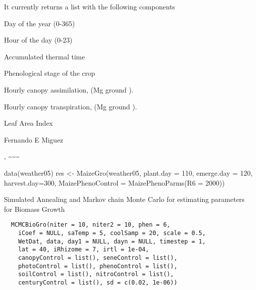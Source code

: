 \documentclass[letterpaper]{book}
\begin{document}
%
\begin{Value}
It currently returns a list with the following components

\begin{ldescription}
\item[\code{DayofYear}] Day of the year (0-365)

\item[\code{Hour}] Hour of the day (0-23)

\item[\code{TTTc}] Accumulated thermal time

\item[\code{PhenoStage}] Phenological stage of the crop

\item[\code{CanopyAssim}] Hourly canopy assimilation, (Mg
 ground ).

\item[\code{CanopyTrans}] Hourly canopy transpiration, (Mg
 ground ).

\item[\code{LAI}] Leaf Area Index
\end{ldescription}
\end{Value}
%
\begin{Author}\relax
Fernando E Miguez
\end{Author}
%
\begin{SeeAlso}\relax
{} 
, \textasciitilde{}\textasciitilde{}\textasciitilde{}
\end{SeeAlso}
%
\begin{Examples}
\begin{ExampleCode}
data(weather05)
res <- MaizeGro(weather05, plant.day = 110, emerge.day = 120, harvest.day=300,
                  MaizePhenoControl = MaizePhenoParms(R6 = 2000))
\end{ExampleCode}
\end{Examples}
%
\begin{Description}\relax
Simulated Annealing and Markov chain Monte Carlo for
estimating parameters for Biomass Growth
\end{Description}
%
\begin{Usage}
\begin{verbatim}
  MCMCBioGro(niter = 10, niter2 = 10, phen = 6,
    iCoef = NULL, saTemp = 5, coolSamp = 20, scale = 0.5,
    WetDat, data, day1 = NULL, dayn = NULL, timestep = 1,
    lat = 40, iRhizome = 7, irtl = 1e-04,
    canopyControl = list(), seneControl = list(),
    photoControl = list(), phenoControl = list(),
    soilControl = list(), nitroControl = list(),
    centuryControl = list(), sd = c(0.02, 1e-06))
\end{verbatim}
\end{Usage}
\end{document}
